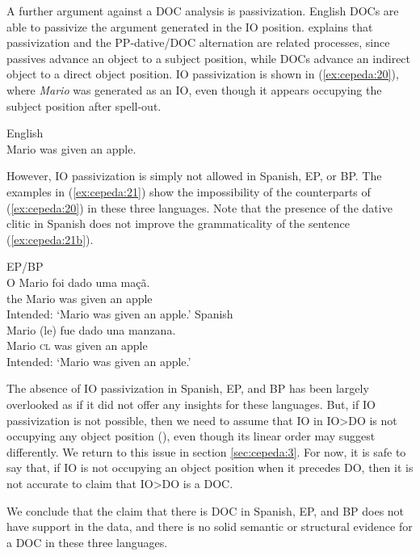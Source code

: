 \documentclass[output=paper,colorlinks,citecolor=brown]{./langscibook}
\begin{document}
A further argument against a DOC analysis is passivization. English DOCs are able to passivize the argument generated in the IO position. \citet{Larson1988} explains that passivization and the PP-dative/DOC alternation are related processes, since passives advance an object to a subject position, while DOCs advance an indirect object to a direct object position. IO passivization is shown in (\ref{ex:cepeda:20}), where \textit{Mario} was generated as an IO, even though it appears occupying the subject position after spell-out.

\ea%
    \label{ex:cepeda:20} 
    English\\
	Mario was given an apple.
\z

However, IO passivization is simply not allowed in Spanish, EP, or BP. The examples in (\ref{ex:cepeda:21}) show the impossibility of the counterparts of (\ref{ex:cepeda:20}) in these three languages. Note that the presence of the dative clitic in Spanish does not improve the grammaticality of the sentence (\ref{ex:cepeda:21b}).

\ea%
    \label{ex:cepeda:21}
	\ea\label{ex:cepeda:21a}
	EP/BP\\
	\gll *O Mario  foi   dado uma maçã.\\
		the Mario was given an    apple\\
	\glt Intended: ‘Mario was given an apple.’
	\ex\label{ex:cepeda:21b}
	Spanish\\
	\gll  *Mario (le) fue dado  una manzana.\\
		Mario \textsc{cl} was given an apple\\
	\glt Intended: ‘Mario was given an apple.’
	\z
\z

The absence of IO passivization in Spanish, EP, and BP has been largely overlooked as if it did not offer any insights for these languages. But, if IO passivization is not possible, then we need to assume that IO in IO>DO is not occupying any object position (\citealt{Larson2014}), even though its linear order may suggest differently. We return to this issue in section \ref{sec:cepeda:3}. For now, it is safe to say that, if IO is not occupying an object position when it precedes DO, then it is not accurate to claim that IO>DO is a DOC.

We conclude that the claim that there is DOC in Spanish, EP, and BP does not have support in the data, and there is no solid semantic or structural evidence for a DOC in these three languages. 
\end{document}
